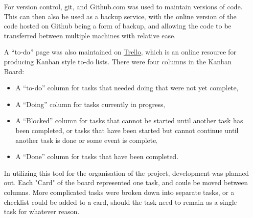 For version control, git, and Github.com was used to maintain versions of code. This can then also be used as a backup service, with the online version of the code hosted on Github being a form of backup, and allowing the code to be transferred between multiple machines with relative ease.

 A “to-do” page was also maintained on \href{https://trello.com}{Trello}, which is an online resource for producing Kanban style to-do lists. There were four columns in the Kanban Board: 
\begin{itemize}
	\item A “to-do” column for tasks that needed doing that were not yet complete, 
	\item A  “Doing” column for tasks currently in progress, 
	\item A “Blocked” column for tasks that cannot be started until another task has been completed, or tasks that have been started but cannot continue until another task is done or some event is complete,
	\item A “Done” column for tasks that have been completed.
\end{itemize}

In utilizing this tool for the organisation of the project, development was planned out. Each "Card" of the board represented one task, and coule be moved between columns. More complicated tasks were broken down into separate tasks, or a checklist could be added to a card, should the task need to remain as a single task for whatever reason.

